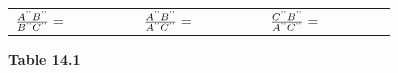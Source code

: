 {{\begin{center}
\begin{xtabular}[t]{|l|l|l|}
                $\frac{{A}^{\text{'}\text{'}}{B}^{\text{'}\text{'}}}{{B}^{\text{'}\text{'}}{C}^{\text{'}\text{'}}}=\phantom{\rule{42.67912pt}{0ex}}$
               &
                $\frac{{A}^{\text{'}\text{'}}{B}^{\text{'}\text{'}}}{{A}^{\text{'}\text{'}}{C}^{\text{'}\text{'}}}=\phantom{\rule{42.67912pt}{0ex}}$
               &
                $\frac{{C}^{\text{'}\text{'}}{B}^{\text{'}\text{'}}}{{A}^{\text{'}\text{'}}{C}^{\text{'}\text{'}}}=\phantom{\rule{42.67912pt}{0ex}}$
     \tabularnewline{}
    \end{xtabular}
      \end{center}
    \begin{center}{\small\bfseries Table 14.1}\end{center}
          } %
        }{%
        }
